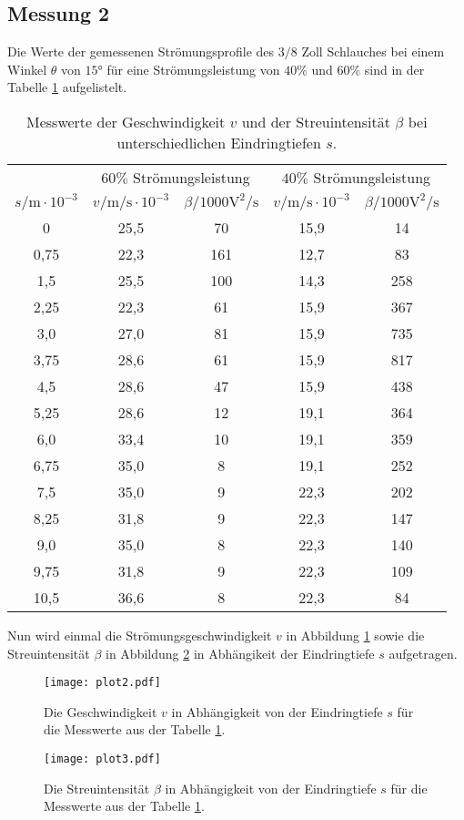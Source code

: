 \newpage
\subsection{Messung 2}
Die Werte der gemessenen Strömungsprofile des $3/8$ Zoll Schlauches bei einem Winkel
$\theta$ von $15\si{\degree}$ für eine Strömungsleistung von $40\%$ und $60\%$  sind in der Tabelle \ref{tab:mess2}
aufgelistelt.
\begin{table}
  \centering
  \caption{Messwerte der Geschwindigkeit $v$ und der Streuintensität $\beta$ bei unterschiedlichen Eindringtiefen $s$.}
  \label{tab:mess2}
  \begin{tabular}{c c c c c}
    \toprule
       & \multicolumn{2}{c}{ $60\%$ Strömungsleistung } &  \multicolumn{2}{c}{$40\%$ Strömungsleistung  } \\
     $s/\si{\meter}\cdot10^{-3}$ & $v/\si{\meter\per\second}\cdot10^{-3}$ & $\beta/1000\si{\volt\tothe{2}\per\second} $ & $v/\si{\meter\per\second}\cdot10^{-3}$ &$\beta/1000\si{\volt\tothe{2}\per\second}$ \\
     \midrule
     0     & 25,5 & 70  & 15,9 & 14\\
     0,75  & 22,3 & 161 & 12,7 & 83\\
     1,5   & 25,5 & 100 & 14,3 & 258\\
     2,25  & 22,3 & 61  & 15,9 & 367\\
     3,0   & 27,0 & 81  & 15,9 & 735\\
     3,75  & 28,6 & 61  & 15,9 & 817\\
     4,5   & 28,6 & 47  & 15,9 & 438\\
     5,25  & 28,6 & 12  & 19,1 & 364\\
     6,0   & 33,4 & 10  & 19,1 & 359\\
     6,75  & 35,0 & 8   & 19,1 & 252\\
     7,5   & 35,0 & 9   & 22,3 & 202\\
     8,25  & 31,8 & 9   & 22,3 & 147\\
     9,0   & 35,0 & 8   & 22,3 & 140\\
     9,75  & 31,8 & 9   & 22,3 & 109\\
     10,5  & 36,6 & 8   & 22,3 & 84\\
    \bottomrule
  \end{tabular}
\end{table}
\FloatBarrier
Nun wird einmal die Strömungsgeschwindigkeit $v$ in Abbildung \ref{fig:v2} sowie die Streuintensität
$\beta$ in Abbildung \ref{fig:b2} in Abhängikeit der Eindringtiefe $s$ aufgetragen.
\begin{figure}
  \texttt{[image: plot2.pdf]}
  \centering
   \caption{Die Geschwindigkeit $v$ in Abhängigkeit von der Eindringtiefe $s$ für die Messwerte aus der Tabelle \ref{tab:mess2}.}
  \label{fig:v2}
\end{figure}

\begin{figure}
  \texttt{[image: plot3.pdf]}
  \centering
   \caption{Die Streuintensität $\beta$ in Abhängigkeit von der Eindringtiefe $s$ für die Messwerte aus der Tabelle \ref{tab:mess2}.}
  \label{fig:b2}
\end{figure}

